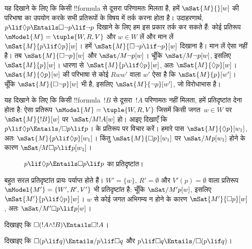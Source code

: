 \documentclass[../../../include/open-logic-section]{subfiles}
\begin{document}
\begin{ex}
  यह दिखाने के लिए कि किसी !!{formula} से दूसरा परिणामतः मिलता है, हमें
  $\mSat{M}{}[w]$ की परिभाषा का उपयोग करके सभी प्रतिरूपों के विषय में तर्क
  करना होता है। उदाहरणार्थ, $p \lif \Diamond p \Entails
  \Box\lnot p \lif \lnot p$ दिखाने के लिए हम इस प्रकार तर्क कर सकते हैं:
  कोई प्रतिरूप $\mModel{M} = \tuple{W, R, V}$ और $w \in W$ लें और मान लें
  $\mSat{M}{p \lif \Diamond p}[w]$। हमें
  $\mSat{M}{\Box\lnot p \lif \lnot p}[w]$ दिखाना है। मान लें ऐसा नहीं है।
  तब $\mSat{M}{\Box\lnot p}[w]$ और $\mSat/{M}{\lnot p}[w]$। चूँकि
  $\mSat/{M}{\lnot p}[w]$, इसलिए $\mSat{M}{p}[w]$। धारणा से
  $\mSat{M}{p \lif \Diamond p}[w]$, अतः $\mSat{M}{\Diamond p}[w]$।
  $\mSat{M}{\Diamond p}[w]$ की परिभाषा से कोई $Rww'$ वाला $w'$ ऐसा है कि
  $\mSat{M}{p}[w']$। चूँकि $\mSat{M}{\Box \lnot p}[w]$ भी है, इसलिए
  $\mSat{M}{\lnot p}[w']$, जो विरोधाभास है।

  यह दिखाने के लिए कि किसी !!{formula}~$!B$ से दूसरा~$!A$ परिणामतः नहीं
  मिलता, हमें प्रतिदृष्टांत देना होता है: ऐसा प्रतिरूप
  $\mModel{M} = \tuple{W, R, V}$ जिसमें किसी जगत~$w \in W$ पर
  $\mSat{M}{!B}[w]$ पर $\mSat/{M}{!A}[w]$ हो। आइए दिखाएँ कि
  $p \lif \Diamond p \Entails/ \Box p \lif p$।
   के प्रतिरूप पर विचार करें। हमारे पास
  $\mSat{M}{\Diamond p}[w_1]$, अतः
  $\mSat{M}{p \lif \Diamond p}[w_1]$। किंतु
  $\mSat{M}{\Box p}[w_1]$ पर $\mSat/{M}{p}[w_1]$ होने के कारण
  $\mSat/{M}{\Box p \lif p}[w_1]$।
  \begin{figure}
  \begin{center}
  \end{center}
  \caption{$p \lif \Diamond p \Entails \Box p \lif p$ का प्रतिदृष्टांत।}
  \end{figure}
  
  बहुत सरल प्रतिदृष्टांत प्रायः पर्याप्त होते हैं। $W' = \{w\}$,
  $R' = \emptyset$ और $V'(p) = \emptyset$ वाला प्रतिरूप
  $\mModel{M'} = \{W', R', V'\}$ भी प्रतिदृष्टांत है: चूँकि
  $\mSat/{M'}{p}[w]$, इसलिए $\mSat{M'}{p \lif \Diamond p}[w]$। $w$ से
  कोई जगत अभिगम्य न होने के कारण $\mSat{M'}{\Box p}[w]$, अतः
  $\mSat/{M'}{\Box p \lif p}[w]$।
\end{ex}

\begin{prob}
  दिखाइए कि $\Box (!A \land !B) \Entails \Box !A$।
\end{prob}

\begin{prob}
  दिखाइए कि $\Box (p \lif q) \Entails/ p \lif \Box q$ और
  $p \lif \Box q \Entails/\Box (p \lif q)$।
\end{prob}
\end{document}
